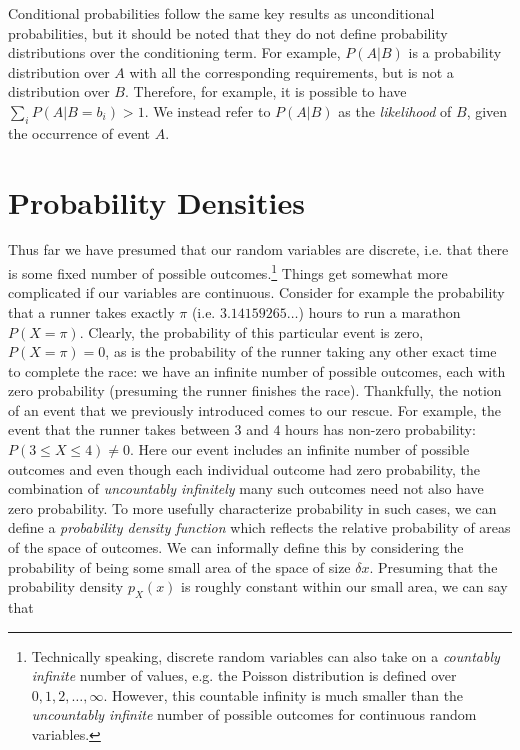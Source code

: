 Conditional probabilities follow  the same key results as unconditional probabilities, but it 
should be noted that they do not define probability distributions over the conditioning term.  
For example, $P(A|B)$ is a probability distribution over $A$ with all the corresponding 
requirements, but is not a distribution over $B$.  Therefore,
for example, it is possible to have $\sum_{i} P(A|B=b_i) >1$.  We instead refer to $P(A|B)$
as the \emph{likelihood} of $B$, given the occurrence of event $A$.

\section{Probability Densities}
\label{sec:prob:den}

Thus far we have presumed that our random variables are discrete, i.e. that there is some fixed
number of possible outcomes.\footnote{Technically speaking, discrete random variables can also
	take on a \emph{countably infinite} number of values, e.g. the Poisson distribution is defined
	over $0,1,2,\dots,\infty$.  
	However, this countable infinity is much smaller than the \emph{uncountably infinite} number
	of possible outcomes for continuous random variables.}
Things get somewhat more complicated if our variables are continuous.  Consider for example
the probability that a runner takes exactly $\pi$ (i.e. $3.14159265\dots$) hours to run a marathon $P(X=\pi)$.  
Clearly, the probability
of this particular event is zero, $P(X=\pi)=0$, as is the probability of the runner taking any other exact time
to complete the race: we have an infinite number of possible outcomes, each with zero probability
(presuming the runner finishes the race).  Thankfully, the notion of an event that we previously
introduced comes to our rescue.  For example, the event that the runner takes between $3$ and
$4$ hours has non-zero probability: $P(3\le X \le 4) \neq 0$.  Here our event includes
an infinite number of possible outcomes and even though each individual outcome had
zero probability, the combination of \emph{uncountably infinitely} many such outcomes need
not also have zero probability.  To more usefully characterize probability in such cases, we can
define a \emph{probability density function} which reflects the relative probability of areas of
the space of outcomes.  We can informally define this by considering the probability
of being some small area of the space of size $\delta x$.  Presuming that the probability density
$p_{X}(x)$ is roughly constant within our small area, we can say that 
